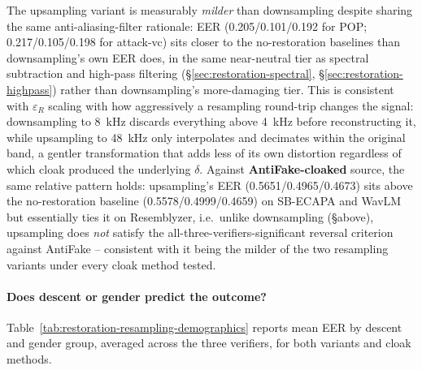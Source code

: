 \documentclass[11pt]{article}
\begin{document}
The upsampling variant is measurably \emph{milder} than downsampling
despite sharing the same anti-aliasing-filter rationale: EER
(0.205/0.101/0.192 for POP; 0.217/0.105/0.198 for attack-vc) sits
closer to the no-restoration baselines than downsampling's own EER
does, in the same near-neutral tier as spectral subtraction and
high-pass filtering (\S\ref{sec:restoration-spectral},
\S\ref{sec:restoration-highpass}) rather than downsampling's
more-damaging tier. This is consistent with $\varepsilon_R$ scaling
with how aggressively a resampling round-trip changes the signal:
downsampling to 8~kHz discards everything above 4~kHz before
reconstructing it, while upsampling to 48~kHz only interpolates and
decimates within the original band, a gentler transformation that adds
less of its own distortion regardless of which cloak produced the
underlying $\delta$. Against \textbf{AntiFake-cloaked} source, the same
relative pattern holds: upsampling's EER (0.5651/0.4965/0.4673) sits
above the no-restoration baseline (0.5578/0.4999/0.4659) on SB-ECAPA and
WavLM but essentially ties it on Resemblyzer, i.e.\ unlike downsampling
(\S above), upsampling does \emph{not} satisfy the
all-three-verifiers-significant reversal criterion against AntiFake --
consistent with it being the milder of the two resampling variants
under every cloak method tested.

\paragraph{Does descent or gender predict the outcome?}
Table~\ref{tab:restoration-resampling-demographics} reports mean EER by
descent and gender group, averaged across the three verifiers, for
both variants and cloak methods.
\end{document}
